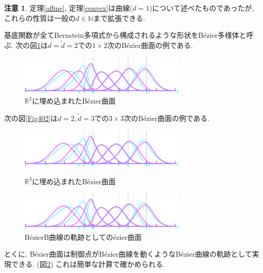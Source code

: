 \documentclass{jsarticle}
\newcommand\setN{\mathbb{N}}
\newcommand\setR{\mathbb{R}}
\theoremstyle{definition}%
\newtheorem*{rem}{注意}
\begin{document}
\begin{rem}
    定理\ref{affine}, 定理\ref{convex}は曲線($d=1$)について述べたものであったが, これらの性質は一般の$d\in \setN$まで拡張できる.
\end{rem}

\newpage

基底関数が全てBernstein多項式から構成されるような形状をB\'{e}zier多様体と呼ぶ.
次の図\ref{Fig401}は$d=\tilde{d}=2$での$1\times 2$次のB\'{e}zier曲面の例である.
\addtocounter{footnote}{-1}
\begin{figure}[H]
	\centering
    \includegraphics[page=10,clip,width=80mm]{figA.pdf}
    \caption{$\setR^2$に埋め込まれたB\'{e}zier曲面\protect\footnotemark}
	\label{Fig401}
\end{figure}
次の図\ref{Fig402}は$d=2, \tilde{d}=3$での$3\times 3$次のB\'{e}zier曲面の例である.
\begin{figure}[H]
    \begin{minipage}{0.5\hsize}
        \begin{center}
            \includegraphics[page=12,clip,width=80mm]{figA.pdf}
        \end{center}
        \caption{$\setR^3$に埋め込まれたB\'{e}zier曲面}
        \label{Fig402}
    \end{minipage}
    \begin{minipage}{0.5\hsize}
        \begin{center}
            \includegraphics[page=13,clip,width=80mm]{figA.pdf}
        \end{center}
        \caption{B\'{e}zierB曲線の軌跡としての\'{e}zier曲面}
        \label{Fig403}
    \end{minipage}
\end{figure}
とくに, B\'{e}zier曲面は制御点がB\'{e}zier曲線を動くようなB\'{e}zier曲線の軌跡として実現できる. (図\ref{Fig403})
これは簡単な計算で確かめられる.
\end{document}
